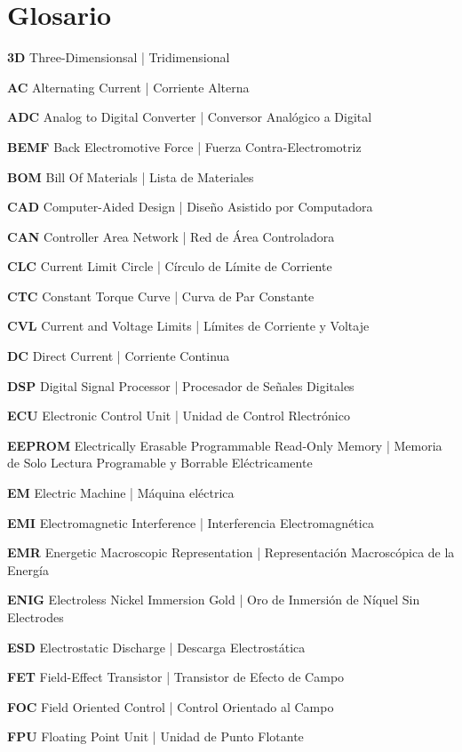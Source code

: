 \chapter*{Glosario}

\textbf{3D} Three-Dimensionsal | Tridimensional

\textbf{AC} Alternating Current | Corriente Alterna

\textbf{ADC} Analog to Digital Converter | Conversor Analógico a Digital

\textbf{BEMF} Back Electromotive Force | Fuerza Contra-Electromotriz

\textbf{BOM} Bill Of Materials | Lista de Materiales

\textbf{CAD} Computer-Aided Design | Diseño Asistido por Computadora

\textbf{CAN} Controller Area Network | Red de Área Controladora

\textbf{CLC} Current Limit Circle | Círculo de Límite de Corriente

\textbf{CTC} Constant Torque Curve | Curva de Par Constante

\textbf{CVL} Current and Voltage Limits | Límites de Corriente y Voltaje

\textbf{DC} Direct Current | Corriente Continua

\textbf{DSP} Digital Signal Processor | Procesador de Señales Digitales

\textbf{ECU} Electronic Control Unit | Unidad de Control Rlectrónico

\textbf{EEPROM} Electrically Erasable Programmable Read-Only Memory | Memoria de Solo Lectura Programable y Borrable Eléctricamente

\textbf{EM} Electric Machine | Máquina eléctrica

\textbf{EMI} Electromagnetic Interference | Interferencia Electromagnética

\textbf{EMR} Energetic Macroscopic Representation | Representación Macroscópica de la Energía

\textbf{ENIG} Electroless Nickel Immersion Gold | Oro de Inmersión de Níquel Sin Electrodes

\textbf{ESD} Electrostatic Discharge | Descarga Electrostática

\textbf{FET} Field-Effect Transistor | Transistor de Efecto de Campo 

\textbf{FOC} Field Oriented Control | Control Orientado al Campo

\textbf{FPU} Floating Point Unit | Unidad de Punto Flotante

